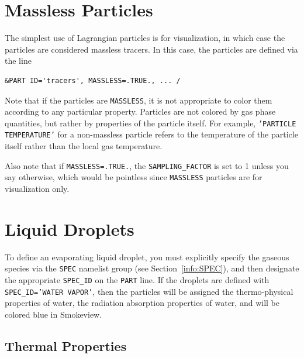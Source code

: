 \documentclass[11pt]{book}
\newcommand{\ct}{\tt\small}
\begin{document}
\section{Massless Particles}
\label{info:MASSLESS}

The simplest use of Lagrangian particles is for visualization, in which case the
particles are considered massless tracers. In this case, the particles are
defined via the line

\footnotesize
\begin{verbatim}
&PART ID='tracers', MASSLESS=.TRUE., ... /
\end{verbatim}
\normalsize

\noindent
Note that if the particles are {\ct MASSLESS}, it is not appropriate to color them according to any particular property.
Particles are not colored by gas phase quantities, but rather by properties of the particle itself. For example,
{\ct 'PARTICLE TEMPERATURE'} for a non-massless particle refers to the temperature of the particle itself
rather than the local gas temperature.

Also note that if {\ct MASSLESS=.TRUE.}, the {\ct SAMPLING\_FACTOR} is set to 1 unless you say otherwise, which would be pointless
since {\ct MASSLESS} particles are for visualization only.

\clearpage

\section{Liquid Droplets}

To define an evaporating liquid droplet, you must explicitly specify the gaseous species via the {\ct SPEC} namelist group (see Section~\ref{info:SPEC}), and then
designate the appropriate {\ct SPEC\_ID} on the {\ct PART} line.
If the droplets are defined with {\ct SPEC\_ID='WATER VAPOR'}, then the particles will be assigned the thermo-physical properties of water,
the radiation absorption properties of water, and will be colored blue in Smokeview.


\subsection{Thermal Properties}
\label{thermal_part_props}
\end{document}
